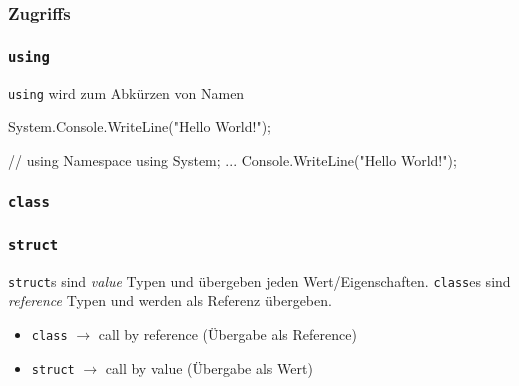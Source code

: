 \documentclass[
  10pt,
  a4paperpaper,
  DIV=11]{scrartcl}
\newenvironment{Shaded}{}{}
\newcommand{\CommentTok}[1]{\textcolor[rgb]{0.42,0.45,0.49}{#1}}
\newcommand{\FunctionTok}[1]{\textcolor[rgb]{0.44,0.26,0.76}{#1}}
\newcommand{\KeywordTok}[1]{\textcolor[rgb]{0.84,0.23,0.29}{#1}}
\newcommand{\NormalTok}[1]{\textcolor[rgb]{0.14,0.16,0.18}{#1}}
\newcommand{\OperatorTok}[1]{\textcolor[rgb]{0.14,0.16,0.18}{#1}}
\newcommand{\StringTok}[1]{\textcolor[rgb]{0.01,0.18,0.38}{#1}}
\providecommand{\tightlist}{%
  \setlength{\itemsep}{0pt}\setlength{\parskip}{0pt}}\usepackage{longtable,booktabs,array}
\numberwithin{equation}{section}
\begin{document}
\hypertarget{zugriffs}{%
\subsubsection{Zugriffs}\label{zugriffs}}

\hypertarget{using}{%
\subsubsection{\texorpdfstring{\texttt{using}}{using}}\label{using}}

\texttt{using} wird zum Abkürzen von Namen

\begin{Shaded}
\begin{Highlighting}[]
\NormalTok{System}\OperatorTok{.}\FunctionTok{Console}\OperatorTok{.}\FunctionTok{WriteLine}\OperatorTok{(}\StringTok{"Hello World!"}\OperatorTok{);}

\CommentTok{// using Namespace}
\KeywordTok{using}\NormalTok{ System}\OperatorTok{;}
\OperatorTok{...}
\NormalTok{Console}\OperatorTok{.}\FunctionTok{WriteLine}\OperatorTok{(}\StringTok{"Hello World!"}\OperatorTok{);}
\end{Highlighting}
\end{Shaded}

\hypertarget{class}{%
\subsubsection{\texorpdfstring{\texttt{class}}{class}}\label{class}}

\hypertarget{struct}{%
\subsubsection{\texorpdfstring{\texttt{struct}}{struct}}\label{struct}}

\begin{tcolorbox}[enhanced jigsaw, coltitle=black, colbacktitle=quarto-callout-important-color!10!white, opacityback=0, colframe=quarto-callout-important-color-frame, arc=.35mm, breakable, toprule=.15mm, rightrule=.15mm, titlerule=0mm, bottomtitle=1mm, colback=white, toptitle=1mm, title=\textcolor{quarto-callout-important-color}{\faExclamation}\hspace{0.5em}{Unterschied \texttt{struct} \& \texttt{class}}, bottomrule=.15mm, leftrule=.75mm, opacitybacktitle=0.6, left=2mm]

\texttt{struct}s sind \emph{value} Typen und übergeben jeden
Wert/Eigenschaften. \texttt{class}es sind \emph{reference} Typen und
werden als Referenz übergeben.

\begin{itemize}
\tightlist
\item
  \texttt{class} \(\rightarrow\) call by reference (Übergabe als
  Reference)
\item
  \texttt{struct} \(\rightarrow\) call by value (Übergabe als Wert)
\end{itemize}

\end{tcolorbox}
\end{document}
